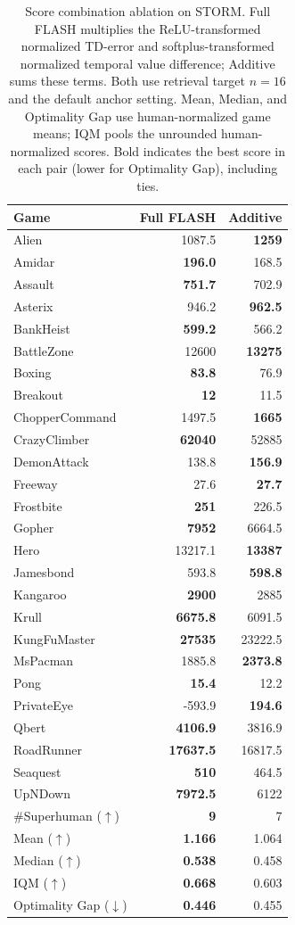 \documentclass{article} %
\begin{document}
\begin{table}[!htbp]
\centering
\small
\caption{Score combination ablation on STORM. Full FLASH multiplies the ReLU-transformed normalized TD-error and softplus-transformed normalized temporal value difference; Additive sums these terms. Both use retrieval target $n=16$ and the default anchor setting. Mean, Median, and Optimality Gap use human-normalized game means; IQM pools the unrounded human-normalized scores. Bold indicates the best score in each pair (lower for Optimality Gap), including ties.}
\label{tab:score_combination_ablation}
\begin{tabular}{lrr}
\toprule
Game & Full FLASH & Additive \\
\midrule
Alien & 1087.5 & \textbf{1259} \\
Amidar & \textbf{196.0} & 168.5 \\
Assault & \textbf{751.7} & 702.9 \\
Asterix & 946.2 & \textbf{962.5} \\
BankHeist & \textbf{599.2} & 566.2 \\
BattleZone & 12600 & \textbf{13275} \\
Boxing & \textbf{83.8} & 76.9 \\
Breakout & \textbf{12} & 11.5 \\
ChopperCommand & 1497.5 & \textbf{1665} \\
CrazyClimber & \textbf{62040} & 52885 \\
DemonAttack & 138.8 & \textbf{156.9} \\
Freeway & 27.6 & \textbf{27.7} \\
Frostbite & \textbf{251} & 226.5 \\
Gopher & \textbf{7952} & 6664.5 \\
Hero & 13217.1 & \textbf{13387} \\
Jamesbond & 593.8 & \textbf{598.8} \\
Kangaroo & \textbf{2900} & 2885 \\
Krull & \textbf{6675.8} & 6091.5 \\
KungFuMaster & \textbf{27535} & 23222.5 \\
MsPacman & 1885.8 & \textbf{2373.8} \\
Pong & \textbf{15.4} & 12.2 \\
PrivateEye & -593.9 & \textbf{194.6} \\
Qbert & \textbf{4106.9} & 3816.9 \\
RoadRunner & \textbf{17637.5} & 16817.5 \\
Seaquest & \textbf{510} & 464.5 \\
UpNDown & \textbf{7972.5} & 6122 \\
\midrule
\#Superhuman ($\uparrow$) & \textbf{9} & 7 \\
Mean ($\uparrow$) & \textbf{1.166} & 1.064 \\
Median ($\uparrow$) & \textbf{0.538} & 0.458 \\
IQM ($\uparrow$) & \textbf{0.668} & 0.603 \\
Optimality Gap ($\downarrow$) & \textbf{0.446} & 0.455 \\
\bottomrule
\end{tabular}
\end{table}
\end{document}
